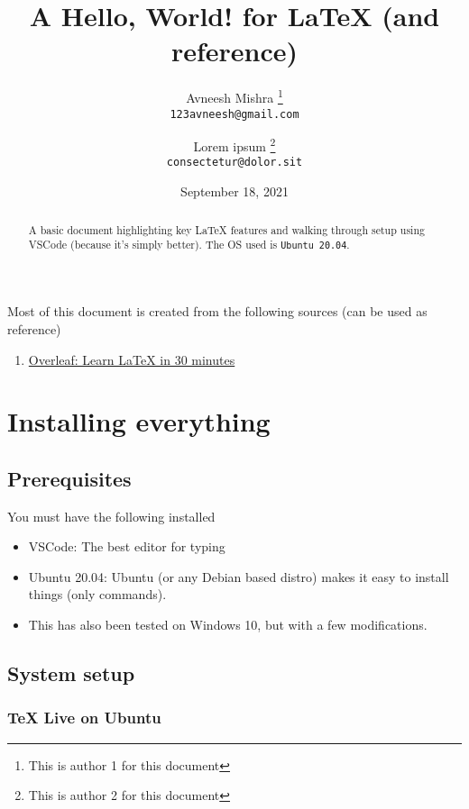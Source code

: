 \documentclass[]{article}
\title{A Hello, World! for \LaTeX{} (and reference)}
\author{
    Avneesh Mishra
    \thanks{This is author 1 for this document} \\
    \texttt{123avneesh@gmail.com}
    \and
    Lorem ipsum 
    \thanks{This is author 2 for this document} \\
    \texttt{consectetur@dolor.sit}
}
\date{September 18, 2021}
\begin{document}
\maketitle

\begin{abstract}
    
    A basic document highlighting key \LaTeX{} features and walking through setup using VSCode (because it's simply better). The OS used is \texttt{Ubuntu 20.04}.

\end{abstract}

Most of this document is created from the following sources (can be used as reference)

\begin{enumerate}
    \item \href{https://www.overleaf.com/learn/latex/Learn_LaTeX_in_30_minutes}{Overleaf: Learn LaTeX in 30 minutes}
\end{enumerate}

\tableofcontents

\section{Installing everything}

\subsection{Prerequisites}

You must have the following installed

\begin{itemize}
    \item VSCode: The best editor for typing
    \item Ubuntu 20.04: Ubuntu (or any Debian based distro) makes it easy to install things (only commands). 
    \item This has also been tested on Windows 10, but with a few modifications.
\end{itemize}

\subsection[Setup]{System setup}

\subsubsection*{TeX Live on Ubuntu}
\end{document}
